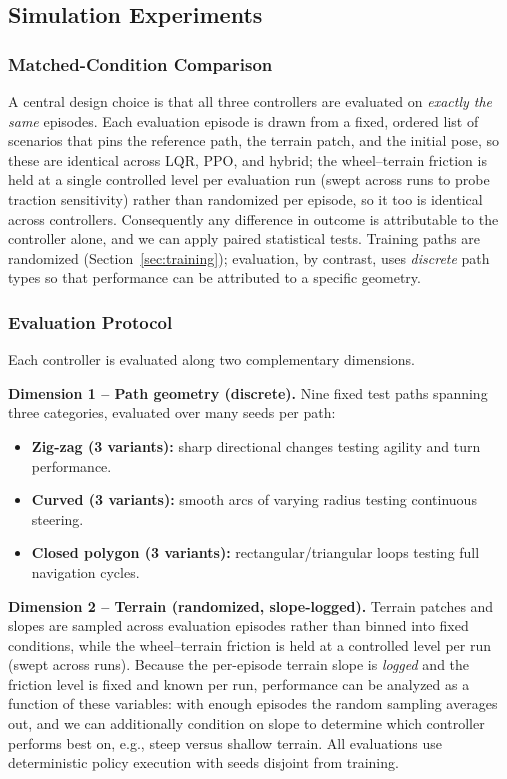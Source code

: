 \documentclass[conference]{IEEEtran}
\begin{document}
\subsection{Simulation Experiments}
\subsubsection{Matched-Condition Comparison}
A central design choice is that all three controllers are evaluated on \emph{exactly the same} episodes. Each evaluation episode is drawn from a fixed, ordered list of scenarios that pins the reference path, the terrain patch, and the initial pose, so these are identical across LQR, PPO, and hybrid; the wheel--terrain friction is held at a single controlled level per evaluation run (swept across runs to probe traction sensitivity) rather than randomized per episode, so it too is identical across controllers. Consequently any difference in outcome is attributable to the controller alone, and we can apply paired statistical tests. Training paths are randomized (Section~\ref{sec:training}); evaluation, by contrast, uses \emph{discrete} path types so that performance can be attributed to a specific geometry.

\subsubsection{Evaluation Protocol}
Each controller is evaluated along two complementary dimensions.

\noindent\textbf{Dimension 1 -- Path geometry (discrete).} Nine fixed test paths spanning three categories, evaluated over many seeds per path:
\begin{itemize}
\item \textbf{Zig-zag (3 variants):} sharp directional changes testing agility and turn performance.
\item \textbf{Curved (3 variants):} smooth arcs of varying radius testing continuous steering.
\item \textbf{Closed polygon (3 variants):} rectangular/triangular loops testing full navigation cycles.
\end{itemize}

\noindent\textbf{Dimension 2 -- Terrain (randomized, slope-logged).} Terrain patches and slopes are sampled across evaluation episodes rather than binned into fixed conditions, while the wheel--terrain friction is held at a controlled level per run (swept across runs). Because the per-episode terrain slope is \emph{logged} and the friction level is fixed and known per run, performance can be analyzed as a function of these variables: with enough episodes the random sampling averages out, and we can additionally condition on slope to determine which controller performs best on, e.g., steep versus shallow terrain. All evaluations use deterministic policy execution with seeds disjoint from training.
\end{document}
